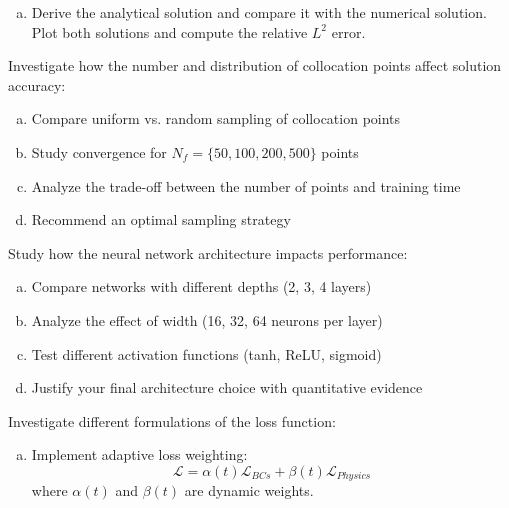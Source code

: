 \begin{problemset}
\begin{problem}
\begin{enumerate}[a)]
\item Derive the analytical solution and compare it with the numerical solution. Plot both solutions and compute the relative $L^2$ error.
\end{enumerate}

\end{problem}

\begin{problem}
Investigate how the number and distribution of collocation points affect solution accuracy:

\begin{enumerate}[a)]
\item Compare uniform vs. random sampling of collocation points
\item Study convergence for $N_f = \{50, 100, 200, 500\}$ points
\item Analyze the trade-off between the number of points and training time
\item Recommend an optimal sampling strategy
\end{enumerate}

\end{problem}

\begin{problem}
Study how the neural network architecture impacts performance:

\begin{enumerate}[a)]
\item Compare networks with different depths (2, 3, 4 layers)
\item Analyze the effect of width (16, 32, 64 neurons per layer)
\item Test different activation functions (tanh, ReLU, sigmoid)
\item Justify your final architecture choice with quantitative evidence
\end{enumerate}

\end{problem}

\begin{problem}
Investigate different formulations of the loss function:

\begin{enumerate}[a)]
\item Implement adaptive loss weighting:
    \begin{equation*}
    \mathcal{L} = \alpha(t)\mathcal{L}_{BCs} + \beta(t)\mathcal{L}_{Physics}
    \end{equation*}
    where $\alpha(t)$ and $\beta(t)$ are dynamic weights.


\end{enumerate}
\end{problem}
\end{problemset}
